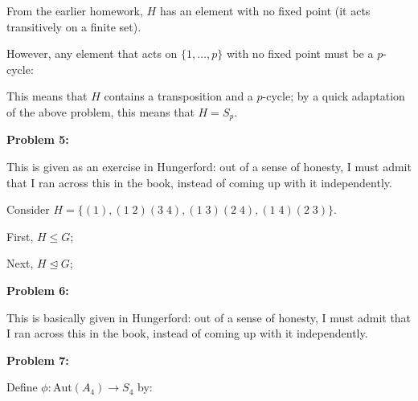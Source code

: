 \documentclass[a4paper,12pt]{article}
\newcommand{\tab}{\hspace{4mm}} %
\newcommand{\shunt}{\vspace{20mm}}
\newcommand{\subgp}{\mathrel{\unlhd}}
\begin{document}
From the earlier homework, $H$ has an element with no fixed point (it acts transitively on a finite set).

However, any element that acts on $\{1, \ldots, p\}$ with no fixed point must be a $p$-cycle:

\tab %

This means that $H$ contains a transposition and a $p$-cycle; by a quick adaptation of the above problem, this means that $H = S_p$.

\shunt

{\bf Problem 5:}

This is given as an exercise in Hungerford: out of a sense of honesty, I must admit that I ran across this in the book, instead of coming up with it independently.

Consider $ H =\{(1), (1 \; 2)(3 \; 4), (1 \; 3) (2 \; 4), (1 \; 4) (2 \; 3)\}$.

First, $H \leq G$;

\tab %

Next, $H \subgp G$;

\tab %

\shunt

{\bf Problem 6:}

This is basically given in Hungerford: out of a sense of honesty, I must admit that I ran across this in the book, instead of coming up with it independently.

\shunt

{\bf Problem 7:}

Define $\phi: \text{Aut}(A_4) \to S_4$ by:


\shunt
\end{document}
